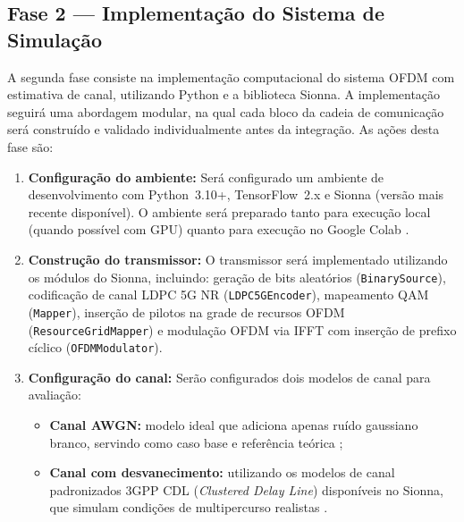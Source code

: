 \documentclass[conference]{IEEEtran}
\begin{document}
\subsection{Fase 2 --- Implementação do Sistema de Simulação}

A segunda fase consiste na implementação computacional do sistema OFDM com estimativa de canal, utilizando Python e a biblioteca Sionna. A implementação seguirá uma abordagem modular, na qual cada bloco da cadeia de comunicação será construído e validado individualmente antes da integração. As ações desta fase são:

\begin{enumerate}
    \item \textbf{Configuração do ambiente:} Será configurado um ambiente de desenvolvimento com Python~3.10+, TensorFlow~2.x e Sionna (versão mais recente disponível). O ambiente será preparado tanto para execução local (quando possível com GPU) quanto para execução no Google Colab \cite{sionna_doc}.

    \item \textbf{Construção do transmissor:} O transmissor será implementado utilizando os módulos do Sionna, incluindo: geração de bits aleatórios (\texttt{BinarySource}), codificação de canal LDPC 5G NR (\texttt{LDPC5GEncoder}), mapeamento QAM (\texttt{Mapper}), inserção de pilotos na grade de recursos OFDM (\texttt{ResourceGridMapper}) e modulação OFDM via IFFT com inserção de prefixo cíclico (\texttt{OFDMModulator}).

    \item \textbf{Configuração do canal:} Serão configurados dois modelos de canal para avaliação:
    \begin{itemize}
        \item \textbf{Canal AWGN:} modelo ideal que adiciona apenas ruído gaussiano branco, servindo como caso base e referência teórica \cite{proakis2008};
        \item \textbf{Canal com desvanecimento:} utilizando os modelos de canal padronizados 3GPP CDL (\textit{Clustered Delay Line}) disponíveis no Sionna, que simulam condições de multipercurso realistas \cite{3gpp38211, 3gpp38901}.
    \end{itemize}


\end{enumerate}
\end{document}
